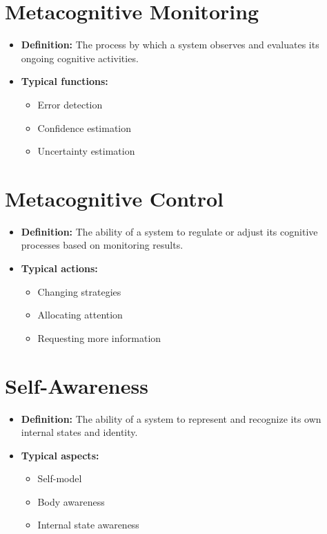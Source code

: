 \documentclass[a4paper]{article}
\begin{document}
    
    \section{Metacognitive Monitoring}
    \begin{itemize}
        \item \textbf{Definition:} The process by which a system observes and evaluates its ongoing cognitive activities.
        \item \textbf{Typical functions:}
        \begin{itemize}
            \item Error detection
            \item Confidence estimation
            \item Uncertainty estimation
        \end{itemize}
    \end{itemize}
    
    
    \section{Metacognitive Control}
    \begin{itemize}
        \item \textbf{Definition:} The ability of a system to regulate or adjust its cognitive processes based on monitoring results.
        \item \textbf{Typical actions:}
        \begin{itemize}
            \item Changing strategies
            \item Allocating attention
            \item Requesting more information
        \end{itemize}
    \end{itemize}
    
    
    \section{Self-Awareness}
    \begin{itemize}
        \item \textbf{Definition:} The ability of a system to represent and recognize its own internal states and identity.
        \item \textbf{Typical aspects:}
        \begin{itemize}
            \item Self-model
            \item Body awareness
            \item Internal state awareness
        \end{itemize}
    \end{itemize}
    
\end{document}
